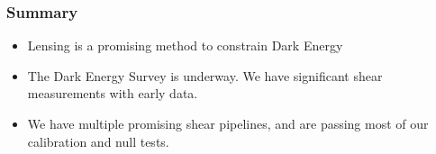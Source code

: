 \documentclass{beamer}
\begin{document}
\frame
{
    \frametitle{Summary}

    \begin{itemize}

        \item Lensing is a promising method to constrain Dark Energy

        \item The Dark Energy Survey is underway.  We have significant shear measurements
            with early data.

        \item We have multiple promising shear pipelines, and are passing most
            of our calibration and null tests.


    \end{itemize}

}
\end{document}
